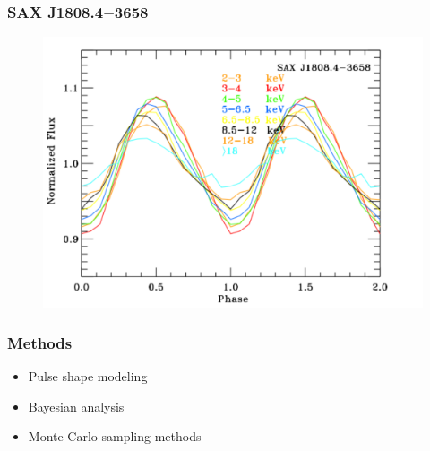 \documentclass{beamer}
\begin{document}
\begin{frame}
\frametitle{SAX J1808.4$-$3658}

\begin{figure}
\includegraphics[width=0.8\linewidth]{data_sax1808.pdf}
\end{figure}

\end{frame}




\begin{frame}
\frametitle{Methods}
\begin{itemize}
\item Pulse shape modeling
\item Bayesian analysis
\item Monte Carlo sampling methods
\end{itemize}
\end{frame}




\end{document}
